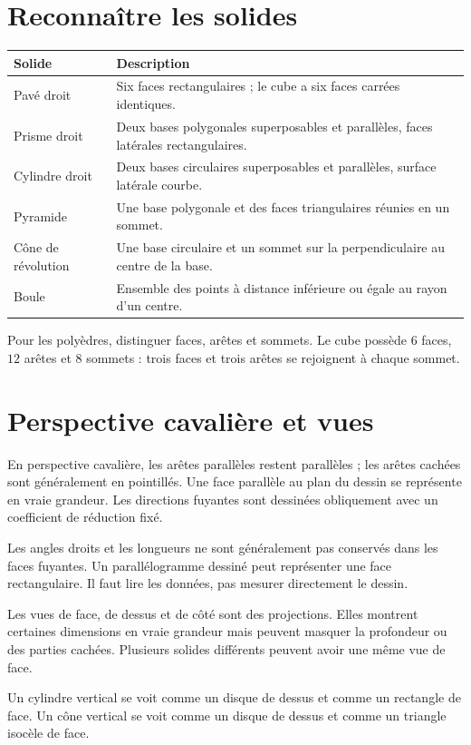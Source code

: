 \documentclass[../cours_3e.tex]{subfiles}
\begin{document}
\section{Reconnaître les solides}
\begin{center}
\begin{tabularx}{\textwidth}{lX}
\toprule Solide & Description\\\midrule
Pavé droit & Six faces rectangulaires ; le cube a six faces carrées identiques.\\
Prisme droit & Deux bases polygonales superposables et parallèles, faces latérales rectangulaires.\\
Cylindre droit & Deux bases circulaires superposables et parallèles, surface latérale courbe.\\
Pyramide & Une base polygonale et des faces triangulaires réunies en un sommet.\\
Cône de révolution & Une base circulaire et un sommet sur la perpendiculaire au centre de la base.\\
Boule & Ensemble des points à distance inférieure ou égale au rayon d'un centre.\\\bottomrule
\end{tabularx}
\end{center}
Pour les polyèdres, distinguer faces, arêtes et sommets. Le cube possède $6$ faces, $12$ arêtes et $8$ sommets : trois faces et trois arêtes se rejoignent à chaque sommet.
\section{Perspective cavalière et vues}
En perspective cavalière, les arêtes parallèles restent parallèles ; les arêtes cachées sont généralement en pointillés. Une face parallèle au plan du dessin se représente en vraie grandeur. Les directions fuyantes sont dessinées obliquement avec un coefficient de réduction fixé.
\begin{attention}
Les angles droits et les longueurs ne sont généralement pas conservés dans les faces fuyantes. Un parallélogramme dessiné peut représenter une face rectangulaire. Il faut lire les données, pas mesurer directement le dessin.
\end{attention}
Les vues de face, de dessus et de côté sont des projections. Elles montrent certaines dimensions en vraie grandeur mais peuvent masquer la profondeur ou des parties cachées. Plusieurs solides différents peuvent avoir une même vue de face.
\begin{exemple}
Un cylindre vertical se voit comme un disque de dessus et comme un rectangle de face. Un cône vertical se voit comme un disque de dessus et comme un triangle isocèle de face.
\end{exemple}
\end{document}
